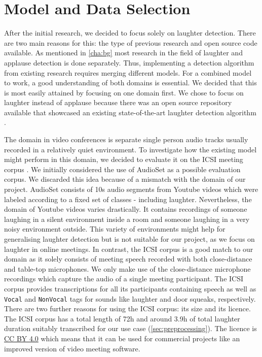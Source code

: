 \documentclass[bsc,frontabs,parskip,deptreport]{infthesis}
\begin{document}
\section{Model and Data Selection}\label{sec:model-and-data}
After the initial research, we decided to focus solely on laughter detection. 
There are two main reasons for this: the type of previous research and open source code available.  
As mentioned in \autoref{cha:bg} most research in the field of laughter and applause detection is done separately. 
Thus, implementing a detection algorithm from existing research requires merging different models. 
For a combined model to work, a good understanding of both domains is essential.
We decided that this is most easily attained by focusing on one domain first. 
We chose to focus on laughter instead of applause because there was an open source repository available that showcased an existing state-of-the-art laughter detection algorithm \citep{gillick-codebase, gillick2021robust}.

The domain in video conferences is separate single person audio tracks usually recorded in a relatively quiet environment.
To investigate how the existing model might perform in this domain, we decided to evaluate it on the ICSI meeting corpus \citep{morgan2001meeting}. 
We initially considered the use of AudioSet \citep{googleaudioset} as a possible evaluation corpus. We discarded this idea because of a mismatch with the domain of our project. AudioSet  consists of 10s audio segments from Youtube videos which were labeled according to a fixed set of classes - including laughter. Nevertheless, the domain of Youtube videos varies drastically. It contains recordings of someone laughing in a silent environment inside a room and someone laughing in a very noisy environment outside. This variety of environments might help for generalising laughter detection but is not suitable for our project, as we focus on laughter in online meetings.
In contrast, the ICSI corpus is a good match to our domain as it solely consists of meeting speech recorded with both close-distance and table-top microphones. 
We only make use of the close-distance microphone recordings which capture the audio of a single meeting participant.
The ICSI corpus provides transcriptions for all its participants containing speech as well as \texttt{Vocal} and \texttt{NonVocal} tags for sounds like laughter and door squeaks, respectively.
There are two further reasons for using the ICSI corpus: its size and its licence.
The ICSI corpus has a total length of 72h and around 3.9h of total laughter duration suitably transcribed for our use case (\autoref{sec:preprocessing}).
The licence is \href{https://creativecommons.org/licenses/by/4.0/legalcode}{CC BY 4.0} which means that it can be used for commercial projects like an improved version of video meeting software. 
\end{document}
